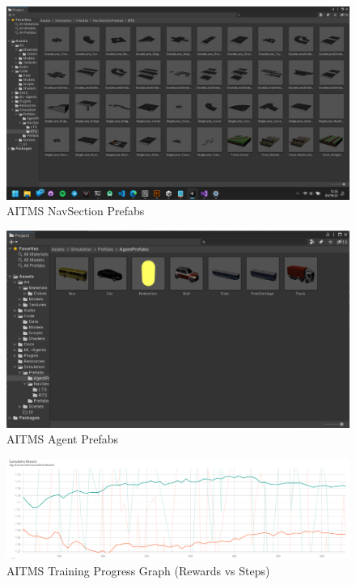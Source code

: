 \documentclass[openany,12pt]{report}
\begin{document}
		\begin{figure}[H]
			\centering
			\includegraphics[width=6in]{./Diagrams/PNG/prefabs}
			\caption{AITMS NavSection Prefabs}
		\end{figure}
		
		\begin{figure}[H]
			\centering
			\includegraphics[width=6in]{./Diagrams/PNG/agent}
			\caption{AITMS Agent Prefabs}
		\end{figure}
		
		\begin{figure}[H]
			\centering
			\includegraphics[width=6in]{./Diagrams/PNG/graph}
			\caption{AITMS Training Progress Graph (Rewards vs Steps)}
		\end{figure}		
		
\end{document}

